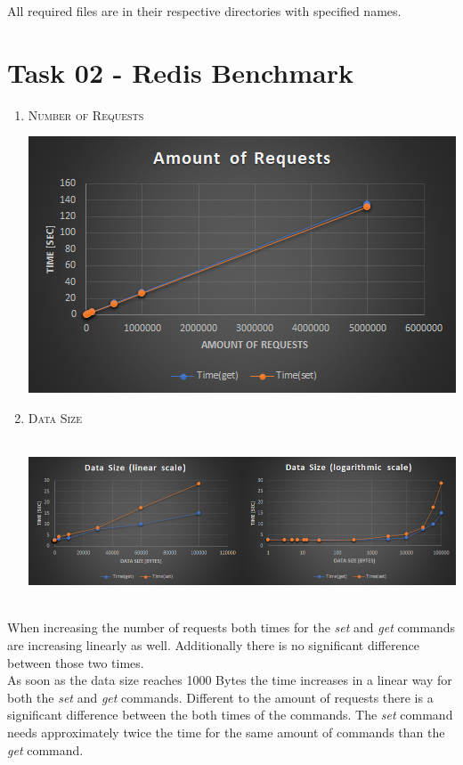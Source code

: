 \documentclass{article}
\begin{document}
	\pagestyle{fancy}
	
	All required files are in their respective directories with specified names.	
	
	\section*{Task 02 - Redis Benchmark}
	\begin{adjustwidth}{2em}{2em}
		\begin{enumerate}[\tiny\textbullet]
			\item \textsc{Number of Requests}
			\begin{center}
				\includegraphics[scale=0.6]{Task_02_Requests.png}
			\end{center}
			\item \textsc{Data Size}
			\begin{adjustwidth}{-3em}{}
				\hfill \\
				\includegraphics[scale=0.6]{Task_02_DataSize.png}
			\end{adjustwidth}
		\end{enumerate}
		\hfill \\
		When increasing the number of requests both times for the \textit{set} and \textit{get} commands are increasing linearly as well. Additionally there is no significant difference between those two times. \\
		As soon as the data size reaches 1000 Bytes the time increases in a linear way for both the \textit{set} and \textit{get} commands. Different to the amount of requests there is a significant difference between the both times of the commands. The \textit{set} command needs approximately twice the time for the same amount of commands than the \textit{get} command.
	\end{adjustwidth}
	
\end{document}
